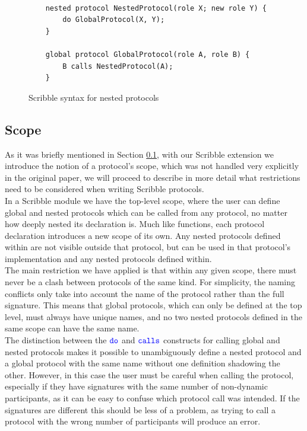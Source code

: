 \documentclass[12pt,twoside]{report}
\begin{document}
\begin{figure}[h]
    \centering
    \lstset{language=Scribble}
    \begin{lstlisting}
    
    nested protocol NestedProtocol(role X; new role Y) {
        do GlobalProtocol(X, Y);
    }
    
    global protocol GlobalProtocol(role A, role B) {
        B calls NestedProtocol(A);
    }
        \end{lstlisting}
        \caption{Scribble syntax for nested protocols}
        \label{scribble-nested-global}
    \end{figure}{}
 
\subsection{Scope}


As it was briefly mentioned in Section \ref{}, with our Scribble extension we introduce the notion of a protocol's scope, which was not handled very explicitly in the original paper, we will proceed to describe in more detail what restrictions need to be considered when writing Scribble protocols.\\

In a Scribble module we have the top-level scope, where the user can define global and nested protocols which can be called from any protocol, no matter how deeply nested its declaration is. Much like functions, each protocol declaration introduces a new scope of its own.  Any nested protocols defined within are not visible outside that protocol, but can be used in that protocol's implementation and any nested protocols defined within.\\

The main restriction we have applied is that within any given scope, there must never be a clash between protocols of the same kind. For simplicity, the naming conflicts only take into account the name of the protocol rather than the full signature. This means that global protocols, which can only be defined at the top level, must always have unique names, and no two nested protocols defined in the same scope can have the same name.\\

The distinction between the ${\color{blue}\mathtt{do}}$ and ${\color{blue}\mathtt{calls}}$ constructs for calling global and nested protocols makes it possible to unambiguously define a nested protocol and a global protocol with the same name without one definition shadowing the other. However, in this case the user must be careful when calling the protocol, especially if they have signatures with the same number of non-dynamic participants, as it can be easy to confuse which protocol call was intended. If the signatures are different this should be less of a problem, as trying to call a protocol with the wrong number of participants will produce an error.\\
\end{document}
